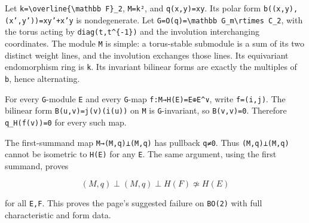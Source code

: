 \documentclass[
  10pt,
]{article}
\begin{document}
Let
\texttt{\small k=\allowbreak{}\textbackslash{}overline\{\textbackslash{}mathbb F\}\_\allowbreak{}2},
\texttt{\small M=\allowbreak{}k²}, and
\texttt{\small q(\allowbreak{}x,\allowbreak{}y)\allowbreak{}=\allowbreak{}xy}.
Its polar form
\texttt{\small b(\allowbreak{}(\allowbreak{}x,\allowbreak{}y)\allowbreak{},\allowbreak{}(\allowbreak{}x',\allowbreak{}y')\allowbreak{})\allowbreak{}=\allowbreak{}xy'+\allowbreak{}x'y}
is nondegenerate. Let
\texttt{\small G=\allowbreak{}O(\allowbreak{}q)\allowbreak{}=\allowbreak{}\textbackslash{}mathbb G\_\allowbreak{}m\textbackslash{}rtimes C\_\allowbreak{}2},
with the torus acting by
\texttt{\small diag(\allowbreak{}t,\allowbreak{}t\textasciicircum{}\{-\allowbreak{}1\})\allowbreak{}}
and the involution interchanging coordinates. The module
\texttt{\small M} is simple: a torus-stable submodule is a sum of its
two distinct weight lines, and the involution exchanges those lines. Its
equivariant endomorphism ring is \texttt{\small k}. Its invariant
bilinear forms are exactly the multiples of \texttt{\small b}, hence
alternating.

For every \texttt{\small G}-module \texttt{\small E} and every
\texttt{\small G}-map
\texttt{\small f:\allowbreak{}M→\allowbreak{}H(\allowbreak{}E)\allowbreak{}=\allowbreak{}E⊕\allowbreak{}E\textasciicircum{}∨},
write
\texttt{\small f=\allowbreak{}(\allowbreak{}i,\allowbreak{}j)\allowbreak{}}.
The bilinear form
\texttt{\small B(\allowbreak{}u,\allowbreak{}v)\allowbreak{}=\allowbreak{}j(\allowbreak{}v)\allowbreak{}(\allowbreak{}i(\allowbreak{}u)\allowbreak{})\allowbreak{}}
on \texttt{\small M} is \texttt{\small G}-invariant, so
\texttt{\small B(\allowbreak{}v,\allowbreak{}v)\allowbreak{}=\allowbreak{}0}.
Therefore
\texttt{\small q\_\allowbreak{}H(\allowbreak{}f(\allowbreak{}v)\allowbreak{})\allowbreak{}=\allowbreak{}0}
for every such map.

The first-summand map
\texttt{\small M→\allowbreak{}(\allowbreak{}M,\allowbreak{}q)\allowbreak{}⊥(\allowbreak{}M,\allowbreak{}q)\allowbreak{}}
has pullback \texttt{\small q≠0}. Thus
\texttt{\small (\allowbreak{}M,\allowbreak{}q)\allowbreak{}⊥(\allowbreak{}M,\allowbreak{}q)\allowbreak{}}
cannot be isometric to \texttt{\small H(\allowbreak{}E)\allowbreak{}}
for any \texttt{\small E}. The same argument, using the first summand,
proves

\[
(M,q)\perp(M,q)\perp H(F)\not\simeq H(E)
\]

for all \texttt{\small E,\allowbreak{}F}. This proves the page's
suggested failure on \texttt{\small BO(\allowbreak{}2)\allowbreak{}}
with full characteristic and form data.
\end{document}
